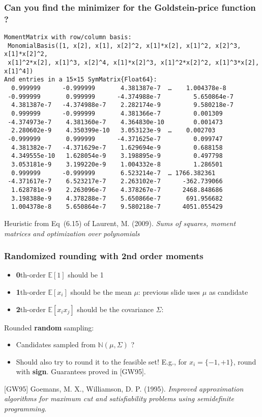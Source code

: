 \documentclass{beamer}
\newcommand\Wider[2][3em]{%
\makebox[\linewidth][c]{%
  \begin{minipage}{\dimexpr\textwidth+#1\relax}
  \raggedright#2
  \end{minipage}%
  }%
}
\begin{document}
\begin{frame}[fragile]
  \frametitle{Can you find the minimizer for the Goldstein-price function ?}
  \vspace{-0.5em}
  \scriptsize
  \begin{verbatim}
MomentMatrix with row/column basis:
 MonomialBasis([1, x[2], x[1], x[2]^2, x[1]*x[2], x[1]^2, x[2]^3, x[1]*x[2]^2,
 x[1]^2*x[2], x[1]^3, x[2]^4, x[1]*x[2]^3, x[1]^2*x[2]^2, x[1]^3*x[2], x[1]^4])
And entries in a 15×15 SymMatrix{Float64}:
  0.999999      -0.999999       4.381387e-7  …    1.004378e-8
 -0.999999       0.999999      -4.374988e-7         5.650864e-7
  4.381387e-7   -4.374988e-7    2.282174e-9         9.580218e-7
  0.999999      -0.999999       4.381366e-7         0.001309
 -4.374973e-7    4.381360e-7    4.364830e-10        0.001473
  2.280602e-9    4.350399e-10   3.053123e-9  …    0.002703
 -0.999999       0.999999      -4.371625e-7         0.099747
  4.381382e-7   -4.371629e-7    1.629694e-9         0.688158
  4.349555e-10   1.628054e-9    3.198895e-9         0.497798
  3.053181e-9    3.199220e-9    1.004332e-8         1.286501
  0.999999      -0.999999       6.523214e-7  … 1766.382361
 -4.371617e-7    6.523217e-7    2.263102e-7      -362.739066
  1.628781e-9    2.263096e-7    4.378267e-7      2468.848686
  3.198388e-9    4.378288e-7    5.650866e-7       691.956682
  1.004378e-8    5.650864e-7    9.580218e-7      4051.055429
  \end{verbatim}

  \vspace{-2em}

  {
  \tiny
  \alert{Heuristic} from Eq~(6.15) of Laurent, M. (2009). \emph{Sums of squares, moment matrices and optimization over polynomials}
  }
\end{frame}

\begin{frame}
  \frametitle{Randomized rounding with 2nd order moments}
  \begin{itemize}
    \item \textbf{0}th-order $\mathbb{E}[1]$ should be 1
    \item \textbf{1}th-order $\mathbb{E}[x_i]$ should be the mean $\mu$: previous slide uses $\mu$ as candidate
    \item \textbf{2}th-order $\mathbb{E}[x_ix_j]$ should be the covariance $\Sigma$:
  \end{itemize}
  \alert{Rounded} \textbf{random} sampling:
  \begin{itemize}
    \item Candidates sampled from $\mathbb{N}(\mu, \Sigma)$ ?
    \item Should also try to round it to the feasible set! E.g., for $x_i = \{-1, +1\}$, round with \textbf{sign}.
      \alert{Guarantees} proved in [GW95].
  \end{itemize}
  {
  \tiny
  [GW95] Goemans, M. X., Williamson, D. P. (1995). \emph{Improved approximation algorithms for maximum cut and satisfiability problems using semidefinite programming.}
  }
\end{frame}
\end{document}
